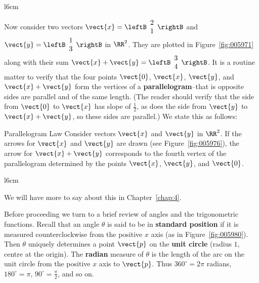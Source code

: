  \begin{wrapfigure}[7]{l}{6cm} 
 \centering
 
 \caption{\label{fig:005971}}
 \end{wrapfigure}
 
Now consider two vectors $\vect{x} = \leftB \begin{array}{rr}
2 \\
1
\end{array} \rightB$
 and $\vect{y} = \leftB \begin{array}{rr}
 1 \\
 3
 \end{array} \rightB$
 in $\RR^2$. They are plotted in Figure~\ref{fig:005971} along with their sum $\vect{x} + \vect{y} = \leftB \begin{array}{rr}
 3 \\
 4
 \end{array} \rightB$.
 It is a routine matter to verify that the four points $\vect{0}$, $\vect{x}$, $\vect{y}$, and $\vect{x} + \vect{y}$ form the vertices of a \textbf{parallelogram}--that is opposite sides are parallel and of the same length. (The reader should verify that the side from $\vect{0}$ to $\vect{x}$ has slope of $\frac{1}{2}$, as does the side from $\vect{y}$ to $\vect{x} + \vect{y}$, so these sides are parallel.) We state this as follows:

\begin{theorem*}[label=thm:parallelogramlaw]{Parallelogram Law}
Consider vectors $\vect{x}$ and $\vect{y}$ in $\RR^2$. If the arrows for $\vect{x}$ and $\vect{y}$ are drawn (see Figure~\ref{fig:005976}), the arrow for $\vect{x} + \vect{y}$ corresponds to the fourth vertex of the parallelogram determined by the points $\vect{x}$, $\vect{y}$, and $\vect{0}$.
\end{theorem*}

\medskip


\begin{wrapfigure}[7]{l}{6cm} 
\centering

\caption{\label{fig:005976}}
\end{wrapfigure}

\noindent We will have more to say about this in Chapter~\ref{chap:4}.

Before proceeding we turn to a brief review of angles and the trigonometric functions. Recall that an angle $\theta$ is said to be in \textbf{standard position} if it is measured counterclockwise from the positive $x$ axis (as in Figure~\ref{fig:005980}). Then $\theta$ uniquely determines a point $\vect{p}$ on the \textbf{unit circle} (radius $1$, centre at the origin). The \textbf{radian} measure of $\theta$ is the length of the arc on the unit circle from the positive $x$ axis to $\vect{p}$. Thus $360^\circ = 2\pi$ radians, $180^\circ = \pi$, $90^\circ = \frac{\pi}{2}$, and so on.

